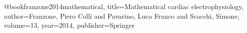 @book{franzone2014mathematical,
	title={Mathematical cardiac electrophysiology},
	author={Franzone, Piero Colli and Pavarino, Luca Franco and Scacchi, Simone},
	volume={13},
	year={2014},
	publisher={Springer}
}